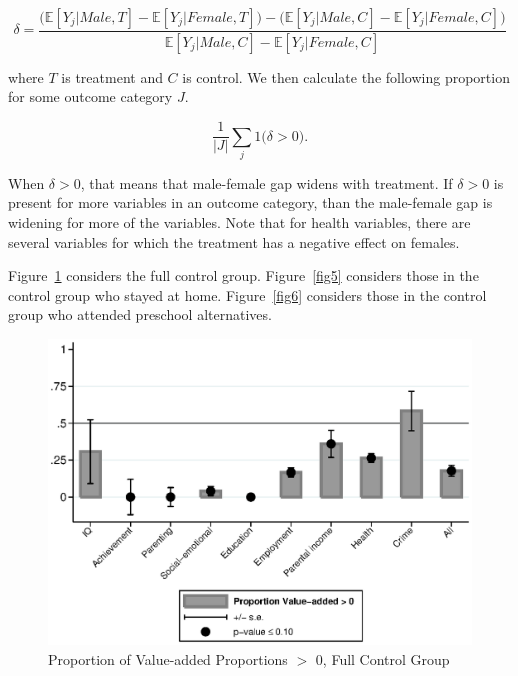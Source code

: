 \begin{equation}
	\delta = \frac{\big(\mathbb{E}[Y_j|Male, T] -\mathbb{E}[Y_j|Female, T] \big) - \big(\mathbb{E}[Y_j|Male, C] -\mathbb{E}[Y_j|Female, C] \big)}{\mathbb{E}[Y_j|Male, C] -\mathbb{E}[Y_j|Female, C]}
\end{equation}

\noindent where $T$ is treatment and $C$ is control. We then calculate the following proportion for some outcome category $J$.

\begin{equation}
	\frac{1}{|J|}\sum_j 1 \big( \delta > 0 \big).
\end{equation}

When $\delta > 0$, that means that male-female gap widens with treatment. If $\delta >0$ is present for more variables in an outcome category, than the male-female gap is widening for more of the variables. Note that for health variables, there are several variables for which the treatment has a negative effect on females. 

Figure~\ref{fig4} considers the full control group. Figure~\ref{fig5} considers those in the control group who stayed at home. Figure~\ref{fig6} considers those in the control group who attended preschool alternatives.

\begin{figure}
\centering
\caption{Proportion of Value-added Proportions $>$ 0, Full Control Group}\label{fig4}
\includegraphics[width=\textwidth]{output/gendergaps-valueadded-proportion}
\end{figure}

